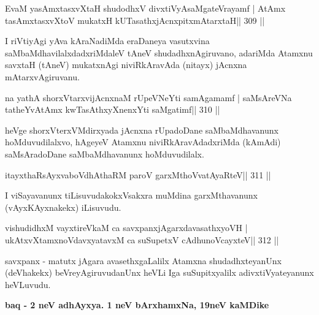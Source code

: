 \begin{shl}
EvaM yasAmxtasxvXtaH shudodhxV divxtiVyAsaMgateVrayamf |
AtAmx tasAmxtasxvXtoV mukatxH kUTasathxjAcnxpitxmAtarxtaH\footnotemark[1]\hfill || 309 ||
\end{shl}

\begin{artha}
I riVtiyAgi yAva kAraNadiMda eraDaneya vasutxvina saMbaMdhavilalxdadx\-riMdaleV tAneV shudadhxnAgiruvano, adariMda Atamxnu savxtaH (tAneV) mukatxnAgi niviRkAravAda (nitayx) jAcnxna mAtarxvAgiruvanu.
\end{artha}

\begin{shl}
na yathA shorxVtarxvijAcnxnaM rUpeVNeYti samAgamamf |
saMsAreVNa tatheYvA\s\s tAmx kwTasAthxyXnenxYti saMgatimf\hfill || 310 ||
\end{shl}

\begin{artha}
heVge shorxVterxVMdirxyada jAcnxna rUpadoDane saMbaMdhavanunx hoMduvu\-dilalxvo, hAgeyeV Atamxnu niviRkAravAdadxriMda (kAmAdi) saMsAradoDane saMbaMdhavanunx hoMduvudilalx.
\end{artha}

\begin{shl}
itayxthaRsAyxvaboVdhAthaRM paroV garxMthoV\s vatAyaRteV\hfill || 311 ||
\end{shl}

\begin{artha}
I viSayavanunx tiLisuvudakokxVsakxra muMdina garxMthavanunx (vAyxKAyxnakekx) iLisuvudu.
\end{artha}

\begin{shl}
vishudidhxM vayxtireVkaM ca savxpanxjAgarxdavasathxyoVH |
ukAtxvX\s\s tamxnoV\s davxyatavxM ca suSupetxV cAdhunoVcayxteV\hfill || 312 ||
\end{shl}

\begin{artha}
savxpanx - matutx jAgara avasethxgaLalilx Atamxna shudadhxteyanUnx 
(deVhakekx) beVreyAgiruvudanUnx heVLi Iga suSupitxyalilx adivxtiVyateyanunx heVLuvudu.
\end{artha}

\begin{center}
{\large\bf baq - 2 neV adhAyxya. 1 neV bArxhamxNa, 19neV kaMDike}
\end{center}


